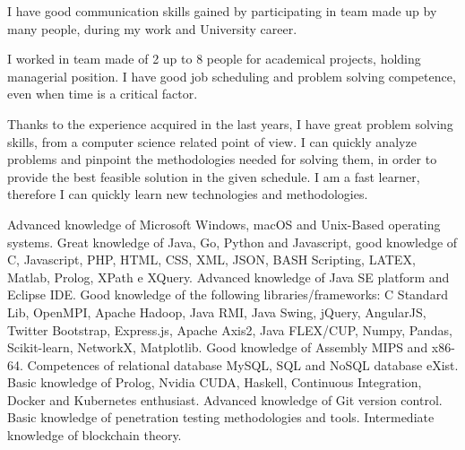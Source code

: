 \documentclass[helvetica,english,logo,notitle,totpages,utf8]{europecv2013}
\begin{document}
\begin{europecv}

\ecvlanguageheader
{}


\ecvlanguagefooter[5pt]

{
I have good communication skills gained by participating in team made up by many people, during my work and University career.
}

{I worked in team made of 2 up to 8 people for academical projects, holding managerial position. I have good job scheduling and problem solving competence, even when time is a critical factor.}



{Thanks to the experience acquired in the last years, I have great problem solving skills, from a computer science related point of view. I can quickly analyze problems and pinpoint the methodologies needed for solving them, in order to provide the best feasible solution in the given schedule. I am a fast learner, therefore I can quickly learn new technologies and methodologies.}

{Advanced knowledge of Microsoft Windows, macOS and Unix-Based operating systems. Great knowledge of Java, Go, Python and Javascript, good knowledge of C, Javascript, PHP, HTML, CSS, XML, JSON, BASH Scripting, LATEX, Matlab, Prolog, XPath e XQuery. Advanced knowledge of Java SE platform and Eclipse IDE. Good knowledge of the following libraries/frameworks: C Standard Lib, OpenMPI, Apache Hadoop, Java RMI, Java Swing, jQuery, AngularJS, Twitter Bootstrap, Express.js, Apache Axis2, Java FLEX/CUP, Numpy, Pandas, Scikit-learn, NetworkX, Matplotlib. Good knowledge of Assembly MIPS and x86-64. Competences of relational database MySQL, SQL and NoSQL database eXist. Basic knowledge of Prolog, Nvidia CUDA, Haskell, Continuous Integration, Docker and Kubernetes enthusiast. Advanced knowledge of Git version control. Basic knowledge of penetration testing methodologies and tools. Intermediate knowledge of blockchain theory.}



\end{europecv}
\end{document}
